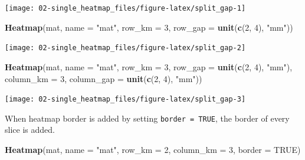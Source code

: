 \documentclass[]{book}
\newenvironment{Shaded}{\begin{snugshade}}{\end{snugshade}}
\newcommand{\KeywordTok}[1]{\textcolor[rgb]{0.13,0.29,0.53}{\textbf{#1}}}
\newcommand{\DataTypeTok}[1]{\textcolor[rgb]{0.13,0.29,0.53}{#1}}
\newcommand{\DecValTok}[1]{\textcolor[rgb]{0.00,0.00,0.81}{#1}}
\newcommand{\StringTok}[1]{\textcolor[rgb]{0.31,0.60,0.02}{#1}}
\newcommand{\OtherTok}[1]{\textcolor[rgb]{0.56,0.35,0.01}{#1}}
\newcommand{\NormalTok}[1]{#1}
\theoremstyle{definition}
\theoremstyle{definition}
\theoremstyle{definition}
\theoremstyle{remark}
\begin{document}
\begin{center}\texttt{[image: 02-single\_heatmap\_files/figure-latex/split\_gap-1]} \end{center}

\begin{Shaded}
\begin{Highlighting}[]
\KeywordTok{Heatmap}\NormalTok{(mat, }\DataTypeTok{name =} \StringTok{"mat"}\NormalTok{, }\DataTypeTok{row_km =} \DecValTok{3}\NormalTok{, }\DataTypeTok{row_gap =} \KeywordTok{unit}\NormalTok{(}\KeywordTok{c}\NormalTok{(}\DecValTok{2}\NormalTok{, }\DecValTok{4}\NormalTok{), }\StringTok{"mm"}\NormalTok{))}
\end{Highlighting}
\end{Shaded}

\begin{center}\texttt{[image: 02-single\_heatmap\_files/figure-latex/split\_gap-2]} \end{center}

\begin{Shaded}
\begin{Highlighting}[]
\KeywordTok{Heatmap}\NormalTok{(mat, }\DataTypeTok{name =} \StringTok{"mat"}\NormalTok{, }\DataTypeTok{row_km =} \DecValTok{3}\NormalTok{, }\DataTypeTok{row_gap =} \KeywordTok{unit}\NormalTok{(}\KeywordTok{c}\NormalTok{(}\DecValTok{2}\NormalTok{, }\DecValTok{4}\NormalTok{), }\StringTok{"mm"}\NormalTok{),}
    \DataTypeTok{column_km =} \DecValTok{3}\NormalTok{, }\DataTypeTok{column_gap =} \KeywordTok{unit}\NormalTok{(}\KeywordTok{c}\NormalTok{(}\DecValTok{2}\NormalTok{, }\DecValTok{4}\NormalTok{), }\StringTok{"mm"}\NormalTok{))}
\end{Highlighting}
\end{Shaded}

\begin{center}\texttt{[image: 02-single\_heatmap\_files/figure-latex/split\_gap-3]} \end{center}

When heatmap border is added by setting \texttt{border\ =\ TRUE}, the
border of every slice is added.

\begin{Shaded}
\begin{Highlighting}[]
\KeywordTok{Heatmap}\NormalTok{(mat, }\DataTypeTok{name =} \StringTok{"mat"}\NormalTok{, }\DataTypeTok{row_km =} \DecValTok{2}\NormalTok{, }\DataTypeTok{column_km =} \DecValTok{3}\NormalTok{, }\DataTypeTok{border =} \OtherTok{TRUE}\NormalTok{)}
\end{Highlighting}
\end{Shaded}
\end{document}
